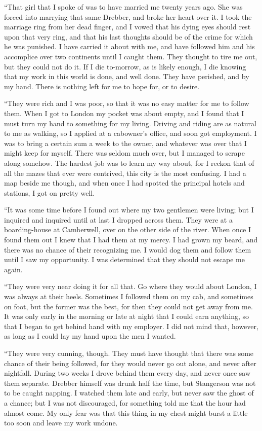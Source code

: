 \documentclass[12pt,english]{book}
\begin{document}
{}``That girl that I spoke of was to have married me twenty years
ago. She was forced into marrying that same Drebber, and broke her
heart over it. I took the marriage ring from her dead finger, and
I vowed that his dying eyes should rest upon that very ring, and that
his last thoughts should be of the crime for which he was punished.
I have carried it about with me, and have followed him and his accomplice
over two continents until I caught them. They thought to tire me out,
but they could not do it. If I die to-morrow, as is likely enough,
I die knowing that my work in this world is done, and well done. They
have perished, and by my hand. There is nothing left for me to hope
for, or to desire.

{}``They were rich and I was poor, so that it was no easy matter
for me to follow them. When I got to London my pocket was about empty,
and I found that I must turn my hand to something for my living. Driving
and riding are as natural to me as walking, so I applied at a cabowner's
office, and soon got employment. I was to bring a certain sum a week
to the owner, and whatever was over that I might keep for myself.
There was seldom much over, but I managed to scrape along somehow.
The hardest job was to learn my way about, for I reckon that of all
the mazes that ever were contrived, this city is the most confusing.
I had a map beside me though, and when once I had spotted the principal
hotels and stations, I got on pretty well.

{}``It was some time before I found out where my two gentlemen were
living; but I inquired and inquired until at last I dropped across
them. They were at a boarding-house at Camberwell, over on the other
side of the river. When once I found them out I knew that I had them
at my mercy. I had grown my beard, and there was no chance of their
recognizing me. I would dog them and follow them until I saw my opportunity.
I was determined that they should not escape me again.

{}``They were very near doing it for all that. Go where they would
about London, I was always at their heels. Sometimes I followed them
on my cab, and sometimes on foot, but the former was the best, for
then they could not get away from me. It was only early in the morning
or late at night that I could earn anything, so that I began to get
behind hand with my employer. I did not mind that, however, as long
as I could lay my hand upon the men I wanted.

{}``They were very cunning, though. They must have thought that there
was some chance of their being followed, for they would never go out
alone, and never after nightfall. During two weeks I drove behind
them every day, and never once saw them separate. Drebber himself
was drunk half the time, but Stangerson was not to be caught napping.
I watched them late and early, but never saw the ghost of a chance;
but I was not discouraged, for something told me that the hour had
almost come. My only fear was that this thing in my chest might burst
a little too soon and leave my work undone.
\end{document}
